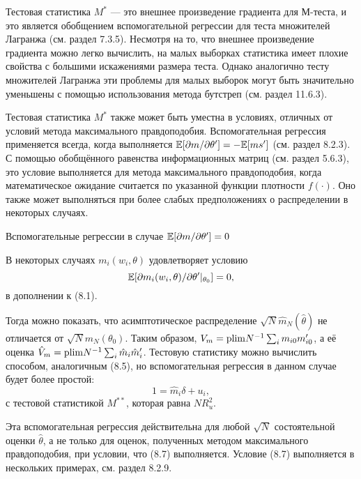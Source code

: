 Тестовая статистика $M^{*}$ --- это внешнее произведение градиента для М-теста, и это является обобщением вспомогательной регрессии для теста множителей Лагранжа (см. раздел 7.3.5). Несмотря на то, что внешнее произведение градиента можно легко вычислить, на малых выборках статистика имеет плохие свойства с большими искажениями размера теста. Однако аналогично тесту множителей Лагранжа эти проблемы для малых выборок могут быть значительно уменьшены с помощью использования метода бутстреп (см. раздел 11.6.3).

Тестовая статистика $M^{*}$ также может быть уместна в условиях, отличных от условий метода максимального правдоподобия. Вспомогательная регрессия применяется всегда, когда выполняется $\mathbb{E}[\partial{m}/\partial{\theta}'] = - \mathbb{E}[ms']$ (см. раздел 8.2.3). С помощью обобщённого равенства информационных матриц (см. раздел 5.6.3), это условие выполняется для метода максимального правдоподобия, когда математическое ожидание считается по указанной функции плотности $f(\cdot)$. Оно также может выполняться при более слабых предположениях о распределении в некоторых случаях.

\begin{center}
Вспомогательные регрессии в случае $\mathbb{E}[\partial{m}/\partial{\theta}'] = 0$
\end{center}

В некоторых случаях $m_i(w_i, \theta)$ удовлетворяет условию
\begin{equation}
\mathbb{E}[\partial{m_i(w_i,\theta)}/\partial{\theta}'|_{\theta_0}] = 0,
\end{equation}
в дополнении к (8.1).

Тогда можно показать, что асимптотическое распределение $\sqrt{N} \hat{m}_N(\hat{\theta})$ не отличается от $\sqrt{N}m_N(\theta_0)$. Таким образом, $V_m = \mathrm{plim } N^{-1}\sum_i m_{i0}m_{i0}'$, а её оценка $\hat{V}_m = \mathrm{plim } N^{-1}\sum_i \hat{m}_i\hat{m}_i'$. Тестовую статистику можно вычислить способом, аналогичным (8.5), но вспомогательная регрессия в данном случае будет более простой:
\begin{equation}
1 = \hat{m}_i \delta + u_i,
\end{equation}
с тестовой статистикой $M^{**}$, которая равна $NR_u^2$.

Эта вспомогательная регрессия действительна для любой $\sqrt{N}$ состоятельной оценки $\hat{\theta}$, а не только
для оценок, полученных методом максимального правдоподобия, при условии, что (8.7) выполняется. Условие (8.7) выполняется в нескольких примерах, см. раздел 8.2.9.

